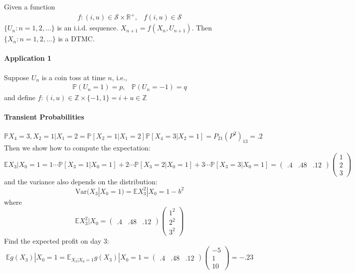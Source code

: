 \begin{theorem}
Given a function
\[
\begin{array}{ll}
f:(i,u)\in\mathcal{S}\times\mathbb{R}^+,
&
f(i,u)\in\mathcal{S}
\end{array}
\]
$\{U_n: n=1,2,\dots\}$ is an i.i.d. sequence. $X_{n+1} = f(X_n,U_{n+1})$. Then $\{X_n: n=1,2,\dots\}$ is a DTMC.
\end{theorem}

\paragraph{Application 1}
Suppose $U_n$ is a coin toss at time $n$, i.e., 
\[
\begin{array}{ll}
\mathbb{P}(U_n = 1) = p,
&
\mathbb{P}(U_n = -1) = q
\end{array}
\]
and define $f: (i,u)\in\mathbb{Z}\times\{-1,1\} = i+u\in\mathbb{Z}$

\paragraph{Transient Probabilities}
\[
\mathbb{P}X_4 = 3,X_2 = 1|X_1 = 2
=
\mathbb{P}[X_2 = 1|X_1 = 2]
\mathbb{P}[X_4 =3 |X_2 = 1]
=
P_{21}(P^2)_{13}=.2
\]
Then we show how to compute the expectation:
\[
\mathbb{E}X_3|X_0 = 1
=
1\cdots \mathbb{P}[X_3 = 1|X_0 = 1]
+
2\cdots \mathbb{P}[X_3 = 2|X_0 = 1]
+
3\cdots \mathbb{P}[X_3 = 3|X_0 = 1]
=
\begin{pmatrix}
.4&.48&.12
\end{pmatrix}\begin{pmatrix}
1\\2\\3
\end{pmatrix}
\]
and the variance also depends on the distribution:
\[
\mbox{Var}(X_3|X_0 = 1)
=
\mathbb{E}X_3^2|X_0 = 1 - b^2
\]
where
\[
\mathbb{E}X_3^2|X_0=\begin{pmatrix}
.4&.48&.12
\end{pmatrix}\begin{pmatrix}
1^2\\2^2\\3^2
\end{pmatrix}
\]
Find the expected profit on day 3:
\[
\mathbb{E}g(X_3)|X_0 = 1
=
\mathbb{E}_{X_3|X_0 = 1}
g(X_3)|X_0 = 1
=
\begin{pmatrix}
.4&.48&.12
\end{pmatrix}\begin{pmatrix}
-5\\1\\10
\end{pmatrix}=-.23
\]










